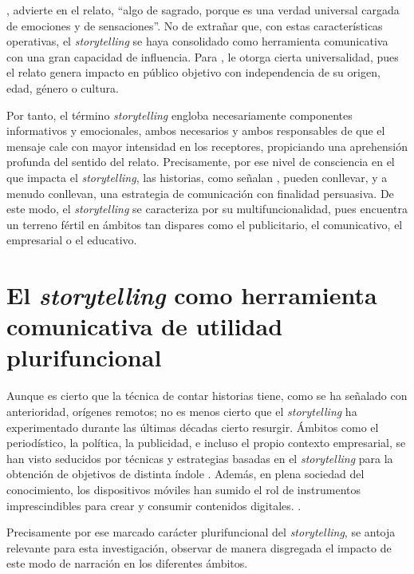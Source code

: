 \documentclass[spanish]{textolivre}
\begin{document}
\textcite[p. 18]{nunez_sera_2007}, advierte en el relato, “algo de sagrado, porque es una verdad universal cargada de emociones y de sensaciones”. No de extrañar que, con estas características operativas, el \textit{storytelling} se haya consolidado como herramienta comunicativa con una gran capacidad de influencia. Para \textcite[p. 1060]{gill_building_2009}, le otorga cierta universalidad, pues el relato genera impacto en público objetivo con independencia de su origen, edad, género o cultura. 

Por tanto, el término \textit{storytelling} engloba necesariamente componentes informativos y emocionales, ambos necesarios y ambos responsables de que el mensaje cale con mayor intensidad en los receptores, propiciando una aprehensión profunda del sentido del relato. Precisamente, por ese nivel de consciencia en el que impacta el \textit{storytelling}, las historias, como señalan \textcite[p. 127]{atamara-rojas_storytelling_2020}, pueden conllevar, y a menudo conllevan, una estrategia de comunicación con finalidad persuasiva. De este modo, el \textit{storytelling} se caracteriza por su multifuncionalidad, pues encuentra un terreno fértil en ámbitos tan dispares como el publicitario, el comunicativo, el empresarial o el educativo. 

\section{El \textit{storytelling} como herramienta comunicativa de utilidad plurifuncional}\label{sec-conduta}
Aunque es cierto que la técnica de contar historias tiene, como se ha señalado con anterioridad, orígenes remotos; no es menos cierto que el \textit{storytelling} ha experimentado durante las últimas décadas cierto resurgir. Ámbitos como el periodístico, la política, la publicidad, e incluso el propio contexto empresarial, se han visto seducidos por técnicas y estrategias basadas en el \textit{storytelling} para la obtención de objetivos de distinta índole \cite{salmon_storytelling:_2008}. Además, en plena sociedad del conocimiento, los dispositivos móviles han sumido el rol de instrumentos imprescindibles para crear y consumir contenidos digitales. \cite{jenkins_transmedia_2003,pratten_getting_2011,scolari_narrativas_2013,galindo_rubio_alisis_2015}.

Precisamente por ese marcado carácter plurifuncional del \textit{storytelling}, se antoja relevante para esta investigación, observar de manera disgregada el impacto de este modo de narración en los diferentes ámbitos.
\end{document}
